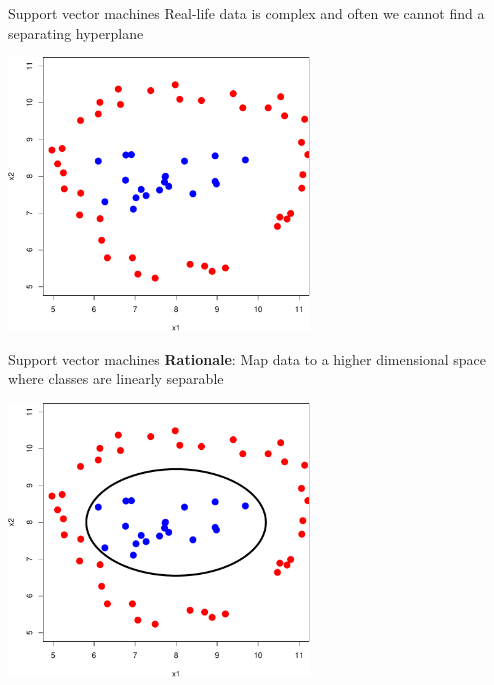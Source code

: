 \documentclass[pdf]{beamer}
\begin{document}
\begin{frame}{Support vector machines}
Real-life data is complex and often we cannot find a separating hyperplane
\vfill
\begin{center}
		\includegraphics[width=0.6\textwidth]{svmNonLinear1.pdf}
\end{center}
\end{frame}

\begin{frame}{Support vector machines}
\textbf{Rationale}: Map data to a higher dimensional space where classes are linearly separable
\vfill
\begin{center}
		\includegraphics[width=0.6\textwidth]{svmNonLinear2.pdf}
\end{center}
\end{frame}
\end{document}
